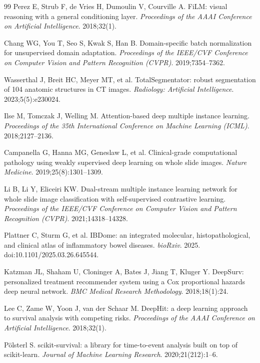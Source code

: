 \documentclass[11pt]{article}
\begin{document}
\begin{thebibliography}{99}
Perez E, Strub F, de Vries H, Dumoulin V, Courville A.
FiLM: visual reasoning with a general conditioning layer.
\textit{Proceedings of the AAAI Conference on Artificial Intelligence}. 2018;32(1).

Chang WG, You T, Seo S, Kwak S, Han B.
Domain-specific batch normalization for unsupervised domain adaptation.
\textit{Proceedings of the IEEE/CVF Conference on Computer Vision and Pattern Recognition (CVPR)}. 2019;7354--7362.

Wasserthal J, Breit HC, Meyer MT, et al.
TotalSegmentator: robust segmentation of 104 anatomic structures in CT images.
\textit{Radiology: Artificial Intelligence}. 2023;5(5):e230024.

Ilse M, Tomczak J, Welling M.
Attention-based deep multiple instance learning.
\textit{Proceedings of the 35th International Conference on Machine Learning (ICML)}. 2018;2127--2136.

Campanella G, Hanna MG, Geneslaw L, et al.
Clinical-grade computational pathology using weakly supervised deep learning on whole slide images.
\textit{Nature Medicine}. 2019;25(8):1301--1309.

Li B, Li Y, Eliceiri KW.
Dual-stream multiple instance learning network for whole slide image classification with self-supervised contrastive learning.
\textit{Proceedings of the IEEE/CVF Conference on Computer Vision and Pattern Recognition (CVPR)}. 2021;14318--14328.

Plattner C, Sturm G, et al.
IBDome: an integrated molecular, histopathological, and clinical atlas of inflammatory bowel diseases.
\textit{bioRxiv}. 2025. doi:10.1101/2025.03.26.645544.

Katzman JL, Shaham U, Cloninger A, Bates J, Jiang T, Kluger Y.
DeepSurv: personalized treatment recommender system using a Cox proportional hazards deep neural network.
\textit{BMC Medical Research Methodology}. 2018;18(1):24.

Lee C, Zame W, Yoon J, van der Schaar M.
DeepHit: a deep learning approach to survival analysis with competing risks.
\textit{Proceedings of the AAAI Conference on Artificial Intelligence}. 2018;32(1).

P{\"o}lsterl S.
scikit-survival: a library for time-to-event analysis built on top of scikit-learn.
\textit{Journal of Machine Learning Research}. 2020;21(212):1--6.


\end{thebibliography}
\end{document}
